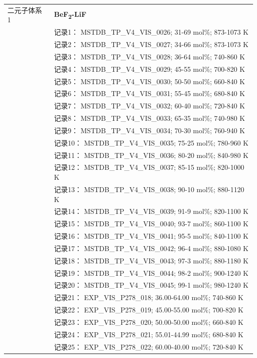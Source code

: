 \documentclass[12pt]{article}
\begin{document}
{\begin{longtable}[]{@{}
  >{\raggedright\arraybackslash}p{}
  >{\raggedright\arraybackslash}p{}@{}}
二元子体系 1  & \textbf{BeF\textsubscript{2}-LiF} \\
 & 记录1： MSTDB\_TP\_V4\_VIS\_0026; 31-69 mol\%; 873-1073 K \\
 & 记录2： MSTDB\_TP\_V4\_VIS\_0027; 34-66 mol\%; 873-1073 K \\
 & 记录3： MSTDB\_TP\_V4\_VIS\_0028; 36-64 mol\%; 740-860 K \\
 & 记录4： MSTDB\_TP\_V4\_VIS\_0029; 45-55 mol\%; 700-820 K \\
 & 记录5： MSTDB\_TP\_V4\_VIS\_0030; 50-50 mol\%; 660-840 K \\
 & 记录6： MSTDB\_TP\_V4\_VIS\_0031; 55-45 mol\%; 680-840 K \\
 & 记录7： MSTDB\_TP\_V4\_VIS\_0032; 60-40 mol\%; 720-840 K \\
 & 记录8： MSTDB\_TP\_V4\_VIS\_0033; 65-35 mol\%; 740-980 K \\
 & 记录9： MSTDB\_TP\_V4\_VIS\_0034; 70-30 mol\%; 760-940 K \\
 & 记录10： MSTDB\_TP\_V4\_VIS\_0035; 75-25 mol\%; 780-960 K \\
 & 记录11： MSTDB\_TP\_V4\_VIS\_0036; 80-20 mol\%; 840-980 K \\
 & 记录12： MSTDB\_TP\_V4\_VIS\_0037; 85-15 mol\%; 820-1000 K \\
 & 记录13： MSTDB\_TP\_V4\_VIS\_0038; 90-10 mol\%; 880-1120 K \\
 & 记录14： MSTDB\_TP\_V4\_VIS\_0039; 91-9 mol\%; 820-1100 K \\
 & 记录15： MSTDB\_TP\_V4\_VIS\_0040; 93-7 mol\%; 860-1100 K \\
 & 记录16： MSTDB\_TP\_V4\_VIS\_0041; 95-5 mol\%; 840-1100 K \\
 & 记录17： MSTDB\_TP\_V4\_VIS\_0042; 96-4 mol\%; 880-1080 K \\
 & 记录18： MSTDB\_TP\_V4\_VIS\_0043; 97-3 mol\%; 880-1180 K \\
 & 记录19： MSTDB\_TP\_V4\_VIS\_0044; 98-2 mol\%; 900-1240 K \\
 & 记录20： MSTDB\_TP\_V4\_VIS\_0045; 99-1 mol\%; 980-1240 K \\
 & 记录21： EXP\_VIS\_P278\_018; 36.00-64.00 mol\%; 740-860 K \\
 & 记录22： EXP\_VIS\_P278\_019; 45.00-55.00 mol\%; 700-820 K \\
 & 记录23： EXP\_VIS\_P278\_020; 50.00-50.00 mol\%; 660-840 K \\
 & 记录24： EXP\_VIS\_P278\_021; 55.01-44.99 mol\%; 680-840 K \\
 & 记录25： EXP\_VIS\_P278\_022; 60.00-40.00 mol\%; 720-840 K \\

\end{longtable}}
\end{document}
